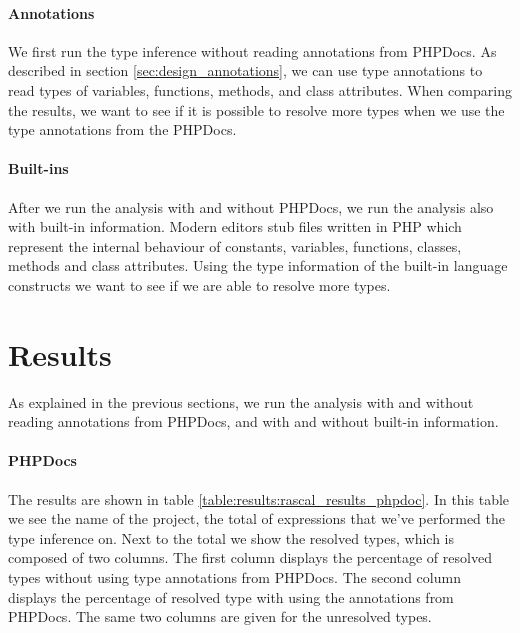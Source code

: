 \documentclass[../main.tex]{subfiles}
\begin{document}
	\paragraph{Annotations}
	We first run the type inference without reading annotations from PHPDocs.
	As described in section \ref{sec:design_annotations}, we can use type annotations to read types of variables, functions, methods, and class attributes.
	When comparing the results, we want to see if it is possible to resolve more types when we use the type annotations from the PHPDocs.
	
	\paragraph{Built-ins}
	After we run the analysis with and without PHPDocs, we run the analysis also with built-in information.
	Modern editors stub files written in PHP which represent the internal behaviour of constants, variables, functions, classes, methods and class attributes.
	Using the type information of the built-in language constructs we want to see if we are able to resolve more types.
			
	\section{Results}\label{sec:evaluation_results}
	
	As explained in the previous sections, we run the analysis with and without reading annotations from PHPDocs, and with and without built-in information.
	
	\paragraph{PHPDocs}
	The results are shown in table \ref{table:results:rascal_results_phpdoc}.
	In this table we see the name of the project, the total of expressions that we've performed the type inference on.
	Next to the total we show the resolved types, which is composed of two columns.
	The first column displays the percentage of resolved types without using type annotations from PHPDocs.
	The second column displays the percentage of resolved type with using the annotations from PHPDocs.
	The same two columns are given for the unresolved types.
\end{document}
